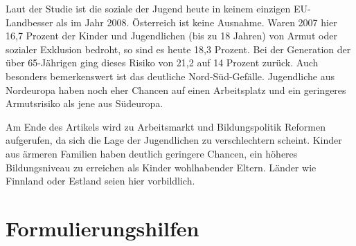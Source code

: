 Laut der Studie ist die soziale der Jugend heute in keinem einzigen EU-Landbesser als im Jahr 2008. Österreich ist keine Ausnahme. Waren 2007 hier 16,7 Prozent der Kinder und Jugendlichen (bis zu 18 Jahren) von Armut oder sozialer Exklusion bedroht, so sind es heute 18,3 Prozent. Bei der Generation der über 65-Jährigen ging dieses Risiko von 21,2 auf 14 Prozent zurück. Auch besonders bemerkenswert ist das deutliche Nord-Süd-Gefälle. Jugendliche aus Nordeuropa haben noch eher Chancen auf einen Arbeitsplatz und ein geringeres Armutsrisiko als jene aus Südeuropa.  

Am Ende des Artikels wird zu Arbeitsmarkt und Bildungspolitik Reformen aufgerufen, da sich die Lage der Jugendlichen zu verschlechtern scheint. Kinder aus ärmeren Familien haben deutlich geringere Chancen, ein höheres Bildungsniveau zu erreichen als Kinder wohlhabender Eltern. Länder wie Finnland oder Estland seien hier vorbildlich. 

\newpage


\section{Formulierungshilfen}

